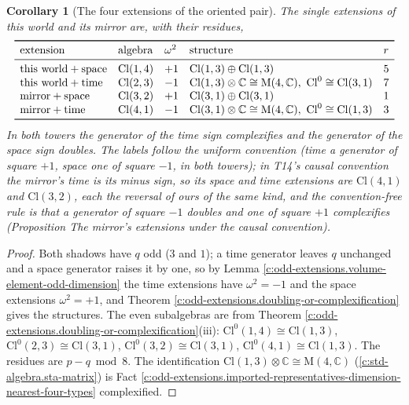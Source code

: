 \documentclass[11pt]{article}
\newtheorem{corollary}[theorem]{Corollary}
\theoremstyle{definition}
\theoremstyle{plain}
\newcommand{\changedmark}[2]{\marginpar{\raggedright\scriptsize\color{#1}#2}}
\providecommand{\C}{}\renewcommand{\C}{\mathbb{C}}
\providecommand{\Cl}{}\renewcommand{\Cl}{\mathrm{Cl}}
\providecommand{\Mat}{}\renewcommand{\Mat}{\mathrm{M}}
\begin{document}
\begin{corollary}[The four extensions of the oriented pair]\label{c:odd-extensions.four-extensions-oriented-pair}
\changedmark{BurntOrange}{changed since the deposit}
The single extensions of this world and its mirror are, with their residues,
\[
\begin{array}{lllll}
\toprule
\text{extension} & \text{algebra} & \omega^{2} & \text{structure} & r \\
\midrule
\text{this world} + \text{space} & \Cl(1,4) & +1 & \Cl(1,3) \oplus \Cl(1,3) & 5 \\
\text{this world} + \text{time}  & \Cl(2,3) & -1 & \Cl(1,3) \otimes \C \cong \Mat(4,\C), \ \Cl^{0} \cong \Cl(3,1) & 7 \\
\text{mirror} + \text{space}     & \Cl(3,2) & +1 & \Cl(3,1) \oplus \Cl(3,1) & 1 \\
\text{mirror} + \text{time}      & \Cl(4,1) & -1 & \Cl(3,1) \otimes \C \cong \Mat(4,\C), \ \Cl^{0} \cong \Cl(1,3) & 3 \\
\bottomrule
\end{array}
\]
In both towers the generator of the time sign complexifies and the generator of the space sign doubles. The labels follow the uniform convention (time a generator of square $+1$, space one of square $-1$, in both towers); in T14's causal convention the mirror's time is its minus sign, so its space and time extensions are $\Cl(4,1)$ and $\Cl(3,2)$, each the reversal of ours of the same kind, and the convention-free rule is that a generator of square $-1$ doubles and one of square $+1$ complexifies (Proposition \emph{The mirror's extensions under the causal convention}).
\end{corollary}
\begin{proof}
Both shadows have $q$ odd ($3$ and $1$); a time generator leaves $q$ unchanged and a space generator raises it by one, so by Lemma \ref{c:odd-extensions.volume-element-odd-dimension} the time extensions have $\omega^{2} = -1$ and the space extensions $\omega^{2} = +1$, and Theorem \ref{c:odd-extensions.doubling-or-complexification} gives the structures. The even subalgebras are from Theorem \ref{c:odd-extensions.doubling-or-complexification}(iii): $\Cl^{0}(1,4) \cong \Cl(1,3)$, $\Cl^{0}(2,3) \cong \Cl(3,1)$, $\Cl^{0}(3,2) \cong \Cl(3,1)$, $\Cl^{0}(4,1) \cong \Cl(1,3)$. The residues are $p - q \bmod 8$. The identification $\Cl(1,3) \otimes \C \cong \Mat(4,\C)$ (\ref{c:std-algebra.sta-matrix}) is Fact \ref{c:odd-extensions.imported-representatives-dimension-nearest-four-types} complexified.

\end{proof}
\end{document}
